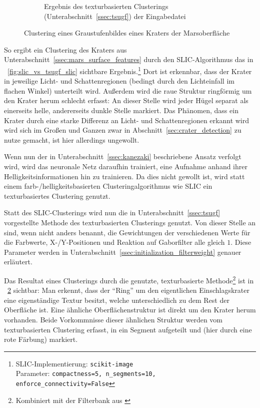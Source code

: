 \begin{figure}[h!]
\begin{subfigure}[t]{0.32\textwidth}
		\captionsetup{format=plain,width=0.85\textwidth}
		\caption{Ergebnis des texturbasierten Clusterings (\vgl Unterabschnitt~\ref{ssec:tsugf}) der Eingabedatei}
		\label{fig:slic_vs_tsugf_tsugf}
	\end{subfigure}
	\caption{Clustering eines Graustufenbildes eines Kraters der Marsoberfläche}
\end{figure}

So ergibt ein Clustering des Kraters aus Unterabschnitt~\ref{ssec:mars_surface_features} durch den SLIC-Algorithmus \cite{achanta_10} das in \figurename~\ref{fig:slic_vs_tsugf_slic} sichtbare Ergebnis.\footnote{SLIC-Implementierung: \texttt{scikit-image}\\Parameter: \texttt{compactness=5, n\_segments=10, enforce\_connectivity=False}} Dort ist erkennbar, dass der Krater in jeweilige Licht- und Schattenregionen (bedingt durch den Lichteinfall im flachen Winkel) unterteilt wird. Außerdem wird die raue Struktur ringförmig um den Krater herum schlecht erfasst: An dieser Stelle wird jeder Hügel separat als einerseits helle, andererseits dunkle Stelle markiert. Das Phänomen, dass ein Krater durch eine starke Differenz an Licht- und Schattenregionen erkannt wird wird sich im Großen und Ganzen zwar in Abschnitt~\ref{sec:crater_detection} zu nutze gemacht, ist hier allerdings ungewollt.

Wenn nun der in Unterabschnitt~\ref{ssec:kanezaki} beschriebene Ansatz verfolgt wird, wird das neuronale Netz daraufhin trainiert, eine Aufnahme anhand ihrer Helligkeitsinformationen hin zu trainieren. Da dies nicht gewollt ist, wird statt einem farb-/helligkeitsbasierten Clusteringalgorithmus wie SLIC ein texturbasiertes Clustering genutzt.

Statt des SLIC-Clusterings wird nun die in Unterabschnitt~\ref{ssec:tsugf} vorgestellte Methode des texturbasierten Clusterings genutzt. Von dieser Stelle an sind, wenn nicht anders benannt, die Gewichtungen der verschiedenen Werte für die Farbwerte, X-/Y-Positionen und Reaktion auf Gaborfilter alle gleich $1$. Diese Parameter werden in Unterabschnitt~\ref{ssec:initialization_filterweight} genauer erläutert.

Das Resultat eines Clusterings durch die genutzte, texturbasierte Methode\footnote{Kombiniert mit der Filterbank aus \cite{jain_91}} ist in \figurename~\ref{fig:slic_vs_tsugf_tsugf} sichtbar: Man erkennt, dass der \enquote{Ring} um den eigentlichen Einschlagskrater eine eigenständige Textur besitzt, welche unterschiedlich zu dem Rest der Oberfläche ist. Eine ähnliche Oberflächenstruktur ist direkt um den Krater herum vorhanden. Beide Vorkommnisse dieser ähnlichen Struktur werden vom texturbasierten Clustering erfasst, in ein Segment aufgeteilt und (hier durch eine rote Färbung) markiert.

